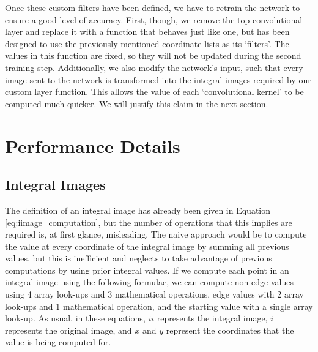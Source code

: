 \documentclass[11pt,a4paper,oldfontcommands]{memoir}
\begin{document}
Once these custom filters have been defined, we have to retrain the network to ensure a good level of accuracy. First, though, we remove the top convolutional layer and replace it with a function that behaves just like one, but has been designed to use the previously mentioned coordinate lists as its `filters'. The values in this function are fixed, so they will not be updated during the second training step. Additionally, we also modify the network's input, such that every image sent to the network is transformed into the integral images required by our custom layer function. This allows the value of each `convolutional kernel' to be computed much quicker. We will justify this claim in the next section.



\section{Performance Details}
\subsection{Integral Images}
The definition of an integral image has already been given in Equation \ref{eq:iimage_computation}, but the number of operations that this implies are required is, at first glance, misleading. The naive approach would be to compute the value at every coordinate of the integral image by summing all previous values, but this is inefficient and neglects to take advantage of previous computations by using prior integral values. If we compute each point in an integral image using the following formulae, we can compute non-edge values using 4 array look-ups and 3 mathematical operations, edge values with 2 array look-ups and 1 mathematical operation, and the starting value with a single array look-up. As usual, in these equations, $ii$ represents the integral image, $i$ represents the original image, and $x$ and $y$ represent the coordinates that the value is being computed for. 
\end{document}
